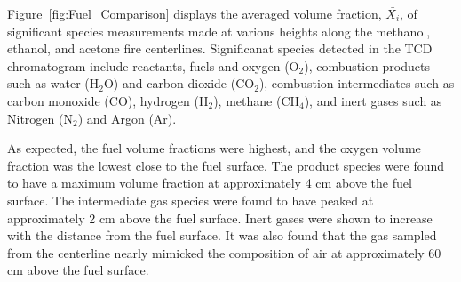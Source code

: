 \documentclass[12pt]{article}
\newcommand*\chem[1]{\ensuremath{\mathrm{#1}}}
\begin{document}
Figure~\ref{fig:Fuel_Comparison} displays the averaged volume fraction, $\bar{X_{i}}$, of significant species measurements made at various heights along the methanol, ethanol, and acetone fire centerlines. Significanat species detected in the TCD chromatogram include reactants, fuels and oxygen ($\chem{O_2}$), combustion products such as water ($\chem{H_2O}$) and carbon dioxide ($\chem{CO_2}$), combustion intermediates such as carbon monoxide ($\chem{CO}$), hydrogen ($\chem{H_2}$), methane ($\chem{CH_4}$), and inert gases such as Nitrogen ($\chem{N_2}$) and Argon ($\chem{Ar}$). 

As expected, the fuel volume fractions were highest, and the oxygen volume fraction was the lowest close to the fuel surface. The product species were found to have a maximum volume fraction at approximately 4 cm above the fuel surface. The intermediate gas species were found to have peaked at approximately 2 cm above the fuel surface. Inert gases were shown to increase with the distance from the fuel surface. It was also found that the gas sampled from the centerline nearly mimicked the composition of air at approximately 60 cm above the fuel surface. 
\end{document}
